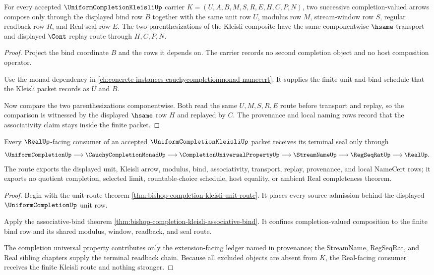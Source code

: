 \begin{theorem}
\label{thm:bishop-completion-kleisli-associative-bind}
For every accepted $\UniformCompletionKleisliUp$ carrier $K=(U,A,B,M,S,R,E,H,C,P,N)$, two successive completion-valued arrows compose only through the displayed bind row $B$ together with the same unit row $U$, modulus row $M$, stream-window row $S$, regular readback row $R$, and Real seal row $E$. The two parenthesizations of the Kleisli composite have the same componentwise $\hsame$ transport and displayed $\Cont$ replay route through $H,C,P,N$.
\end{theorem}
\begin{proof}
Project the bind coordinate $B$ and the rows it depends on. The carrier records no second completion object and no host composition operator.

Use the monad dependency in \autoref{ch:concrete-instances-cauchycompletionmonad-namecert}. It supplies the finite unit-and-bind schedule that the Kleisli packet records as $U$ and $B$.

Now compare the two parenthesizations componentwise. Both read the same $U,M,S,R,E$ route before transport and replay, so the comparison is witnessed by the displayed $\hsame$ row $H$ and replayed by $C$. The provenance and local naming rows record that the associativity claim stays inside the finite packet.
\end{proof}

\begin{theorem}
\label{thm:bishop-completion-kleisli-real-route}
Every $\RealUp$-facing consumer of an accepted $\UniformCompletionKleisliUp$ packet receives its terminal seal only through
$$
\UniformCompletionUp \longrightarrow \CauchyCompletionMonadUp \longrightarrow \CompletionUniversalPropertyUp \longrightarrow \StreamNameUp \longrightarrow \RegSeqRatUp \longrightarrow \RealUp .
$$
The route exports the displayed unit, Kleisli arrow, modulus, bind, associativity, transport, replay, provenance, and local NameCert rows; it exports no quotient completion, selected limit, countable-choice schedule, host equality, or ambient Real completeness theorem.
\end{theorem}
\begin{proof}
Begin with the unit-route theorem \autoref{thm:bishop-completion-kleisli-unit-route}. It places every source admission behind the displayed $\UniformCompletionUp$ unit row.

Apply the associative-bind theorem \autoref{thm:bishop-completion-kleisli-associative-bind}. It confines completion-valued composition to the finite bind row and its shared modulus, window, readback, and seal route.

The completion universal property contributes only the extension-facing ledger named in provenance; the StreamName, RegSeqRat, and Real sibling chapters supply the terminal readback chain. Because all excluded objects are absent from $K$, the Real-facing consumer receives the finite Kleisli route and nothing stronger.
\end{proof}

